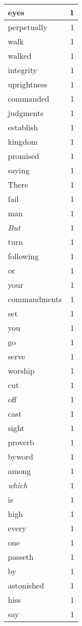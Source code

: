 \begin{center}
\begin{longtable}{l|r}
eyes & 1 \\ \hline
perpetually & 1 \\ \hline
walk & 1 \\ \hline
walked & 1 \\ \hline
integrity & 1 \\ \hline
uprightness & 1 \\ \hline
commanded & 1 \\ \hline
judgments & 1 \\ \hline
establish & 1 \\ \hline
kingdom & 1 \\ \hline
promised & 1 \\ \hline
saying & 1 \\ \hline
There & 1 \\ \hline
fail & 1 \\ \hline
man & 1 \\ \hline
\emph{But} & 1 \\ \hline
turn & 1 \\ \hline
following & 1 \\ \hline
or & 1 \\ \hline
your & 1 \\ \hline
commandments & 1 \\ \hline
set & 1 \\ \hline
you & 1 \\ \hline
go & 1 \\ \hline
serve & 1 \\ \hline
worship & 1 \\ \hline
cut & 1 \\ \hline
off & 1 \\ \hline
cast & 1 \\ \hline
sight & 1 \\ \hline
proverb & 1 \\ \hline
byword & 1 \\ \hline
among & 1 \\ \hline
\emph{which} & 1 \\ \hline
is & 1 \\ \hline
high & 1 \\ \hline
every & 1 \\ \hline
one & 1 \\ \hline
passeth & 1 \\ \hline
by & 1 \\ \hline
astonished & 1 \\ \hline
hiss & 1 \\ \hline
say & 1 \\ \hline

\end{longtable}
\end{center}
